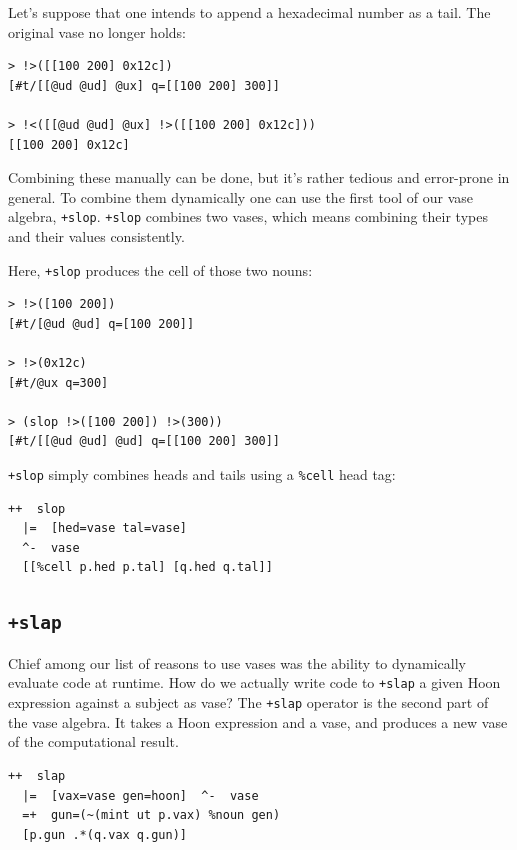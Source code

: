 \documentclass[twoside]{article}
\begin{document}
Let's suppose that one intends to append a hexadecimal number as a tail.  The original vase no longer holds:

\begin{lstlisting}[style=listingcode]
> !>([[100 200] 0x12c])
[#t/[[@ud @ud] @ux] q=[[100 200] 300]]

> !<([[@ud @ud] @ux] !>([[100 200] 0x12c]))
[[100 200] 0x12c]
\end{lstlisting}

\noindent
Combining these manually can be done, but it's rather tedious and error-prone in general.  To combine them dynamically one can use the first tool of our vase algebra, \lstinline[style=inlinecode]{+slop}.  \lstinline[style=inlinecode]{+slop} combines two vases, which means combining their types and their values consistently.

Here, \lstinline[style=inlinecode]{+slop} produces the cell of those two nouns:

\begin{lstlisting}[style=listingcode]
> !>([100 200])
[#t/[@ud @ud] q=[100 200]]

> !>(0x12c)
[#t/@ux q=300]

> (slop !>([100 200]) !>(300))
[#t/[[@ud @ud] @ud] q=[[100 200] 300]]
\end{lstlisting}

\noindent
\lstinline[style=inlinecode]{+slop} simply combines heads and tails using a \lstinline[style=inlinecode]{%cell} head tag:

\begin{lstlisting}[style=listingcode]
++  slop
  |=  [hed=vase tal=vase]
  ^-  vase
  [[%cell p.hed p.tal] [q.hed q.tal]]
\end{lstlisting}

\subsection{\lstinline[style=inlinecode]{+slap}}

Chief among our list of reasons to use vases was the ability to dynamically evaluate code at runtime.  How do we actually write code to \lstinline[style=inlinecode]{+slap} a given Hoon expression against a subject as vase?  The \lstinline[style=inlinecode]{+slap} operator is the second part of the vase algebra.  It takes a Hoon expression and a vase, and produces a new vase of the computational result.

\begin{lstlisting}[style=listingcode]
++  slap
  |=  [vax=vase gen=hoon]  ^-  vase
  =+  gun=(~(mint ut p.vax) %noun gen)
  [p.gun .*(q.vax q.gun)]
\end{lstlisting}
\end{document}
